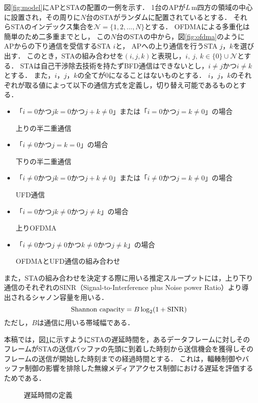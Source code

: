 \documentclass[technicalreport]{ieicej}
\newcommand{\sijk}{(i,j,k)}
\newcommand{\mN}{{\mathcal N}}
\begin{document}
	図\ref{fig:model}にAPとSTAの配置の一例を示す．
	1台のAPが$L$\,m四方の領域の中心に設置され，その周りに$N$台のSTAがランダムに配置されているとする．
	それらSTAのインデックス集合を$\mN=\{1,2,...,N\}$とする．
	OFDMAによる多重化は簡単のため二多重までとし，
	この$N$台のSTAの中から，図\ref{fig:ofdma}のようにAPからの下り通信を受信するSTA $i$と，
	APへの上り通信を行うSTA $j$，$k$を選び出す．
	このとき，STAの組み合わせを$\sijk$と表現し，$i,\ j,\ k \in \{0\}\cup \mN$とする．
	STAは自己干渉除去技術を持たずBFD通信はできないとし，$i\neq j$かつ$i\neq k$とする．
	また，$i$，$j$，$k$の全てが0になることはないものとする．
	$i$，$j$，$k$のそれぞれが取る値によって以下の通信方式を定義し，切り替え可能であるものとする．
	\begin{itemize}%
		\item「$i=0$かつ$jk=0$かつ$j+k\neq0$」または「$i=0$かつ$j=k\neq0$」の場合\par
			\hspace*{15pt}上りの半二重通信
		\item「$i\neq0$かつ$j=k=0$」の場合\par
			\hspace*{15pt}下りの半二重通信
		\item「$i\neq0$かつ$jk=0$かつ$j+k\neq0$」または「$i\neq0$かつ$j=k\neq0$」の場合\par
			\hspace*{15pt}UFD通信
		\item「$i=0$かつ$jk\neq0$かつ$j\neq k$」の場合\par
			\hspace*{15pt}上りOFDMA
		\item「$i\neq0$かつ$j\neq0$かつ$k\neq0$かつ$j\neq k$」の場合\par
			\hspace*{15pt}OFDMAとUFD通信の組み合わせ
	\end{itemize}
	\par
	また，STAの組み合わせを決定する際に用いる推定スループットには，上り下り通信のそれぞれのSINR（Signal-to-Interference plus Noise power Ratio）より導出されるシャノン容量を用いる．
	\begin{equation}
		{\rm Shannon\ capacity}=B\log_2(1+{\rm SINR}) \label{eq:capacity}
	\end{equation}
	ただし，$B$は通信に用いる帯域幅である．
	\par
	本稿では，図\ref{fig:standby}に示すようにSTAの遅延時間を，あるデータフレームに対しそのフレームがSTAの送信バッファの先頭に到着した時刻から送信機会を獲得しそのフレームの送信が開始した時刻までの経過時間とする．
	これは，輻輳制御やバッファ制御の影響を排除した無線メディアアクセス制御における遅延を評価するためである．
	\begin{figure}[t]
		\centering
		\caption{遅延時間の定義}
		\label{fig:standby}
	\end{figure}
\end{document}
